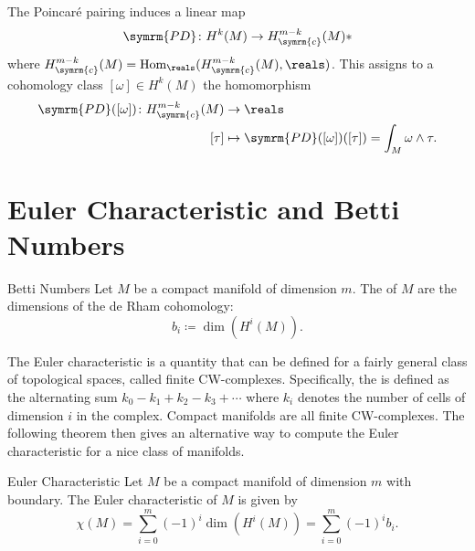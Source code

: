 \documentclass[fleqn]{NotesClass}
\DeclareMathOperator{\Hom}{Hom}
\newcommand{\compact}{\symrm{c}}
\newcommand{\poincareDuality}{\symrm{PD}}
\begin{document}
    \begin{crl}{}{}
        The Poincar\'e pairing induces a linear map
        \begin{equation}
            \poincareDuality \colon H^k(M) \to H_{\compact}^{m - k}(M)*
        \end{equation}
        where \(H_{\compact}^{m-k}(M) = \Hom_{\reals}(H_{\compact}^{m-k}(M), \reals)\).
        This assigns to a cohomology class \([\omega] \in H^k(M)\) the homomorphism
        \begin{align}
            \poincareDuality([\omega]) \colon H_{\compact}^{m - k}(M) &\to \reals\\
            [\tau] &\mapsto \poincareDuality([\omega])([\tau]) = \int_M \omega \wedge \tau.
        \end{align}
    \end{crl}
    
    \section{Euler Characteristic and Betti Numbers}
    \begin{dfn}{Betti Numbers}{}
        Let \(M\) be a compact manifold of dimension \(m\).
        The  of \(M\) are the dimensions of the de Rham cohomology:
        \begin{equation}
            b_i \coloneqq \dim (H^i(M)).
        \end{equation}
    \end{dfn}
    
    The Euler characteristic is a quantity that can be defined for a fairly general class of topological spaces, called finite CW-complexes.
    Specifically, the  is defined as the alternating sum \(k_0 - k_1 + k_2 - k_3 + \dotsb\) where \(k_i\) denotes the number of cells of dimension \(i\) in the complex.
    Compact manifolds are all finite CW-complexes.
    The following theorem then gives an alternative way to compute the Euler characteristic for a nice class of manifolds.
    
    \begin{thm}{Euler Characteristic}{}
        Let \(M\) be a compact manifold of dimension \(m\) with boundary.
        The Euler characteristic of \(M\) is given by
        \begin{equation}
            \chi(M) = \sum_{i=0}^m (-1)^i \dim(H^i(M)) = \sum_{i=0}^m (-1)^i b_i.
        \end{equation}
    \end{thm}
    
\end{document}
